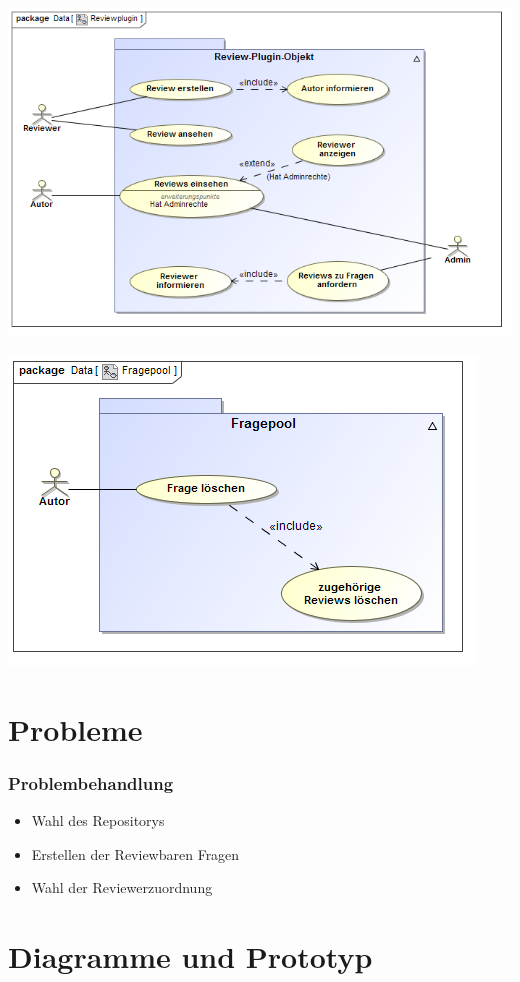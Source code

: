 \documentclass{beamer}
\begin{document}
		\begin{frame}
			\includegraphics[scale=0.45]{Diagramme/Use_Case_Diagram__Reviewplugin.png}
			\label{Reviewplugin}	
		\end{frame}
		\begin{frame}
			\includegraphics[scale=0.7]{Diagramme/Use_Case_Diagram__Fragepool.png}
				\label{Fragepool}
		\end{frame}
	\section{Probleme}
		\begin{frame}
			\frametitle{Problembehandlung}
    		\begin{itemize}
    			\item Wahl des Repositorys
		    	\item Erstellen der Reviewbaren Fragen
    			\item Wahl der Reviewerzuordnung
    		\end{itemize}
		\end{frame}

	\section{Diagramme und Prototyp}
		
\end{document}
